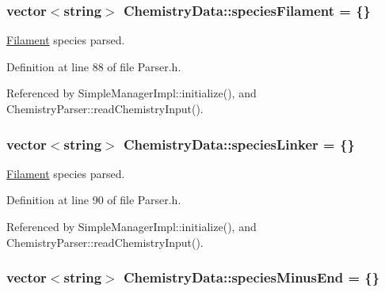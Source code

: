 \hypertarget{structChemistryData_a3389b17268aaefcba28539ec3b5e5e35}{
\subsubsection[{species\+Filament}]{\setlength{\rightskip}{0pt plus 5cm}vector$<$string$>$ Chemistry\+Data\+::species\+Filament = \{\}}}\label{structChemistryData_a3389b17268aaefcba28539ec3b5e5e35}


\hyperlink{classFilament}{Filament} species parsed. 



Definition at line 88 of file Parser.\+h.



Referenced by Simple\+Manager\+Impl\+::initialize(), and Chemistry\+Parser\+::read\+Chemistry\+Input().

\hypertarget{structChemistryData_ab41e13ef134b8cb9066fff74ece920ca}{
\subsubsection[{species\+Linker}]{\setlength{\rightskip}{0pt plus 5cm}vector$<$string$>$ Chemistry\+Data\+::species\+Linker = \{\}}}\label{structChemistryData_ab41e13ef134b8cb9066fff74ece920ca}


\hyperlink{classFilament}{Filament} species parsed. 



Definition at line 90 of file Parser.\+h.



Referenced by Simple\+Manager\+Impl\+::initialize(), and Chemistry\+Parser\+::read\+Chemistry\+Input().

\hypertarget{structChemistryData_a8b638671871e8cc1ef65f2c7429d6254}{
\subsubsection[{species\+Minus\+End}]{\setlength{\rightskip}{0pt plus 5cm}vector$<$string$>$ Chemistry\+Data\+::species\+Minus\+End = \{\}}}\label{structChemistryData_a8b638671871e8cc1ef65f2c7429d6254}


